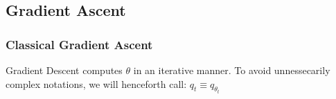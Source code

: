 \subsection{Gradient Ascent}

\subsubsection{Classical Gradient Ascent}



\bigskip


Gradient Descent computes $\theta$ in an iterative manner. To avoid unnessecarily complex notations, we will henceforth call: $q_t \equiv q_{\theta_t}$



\pagebreak



